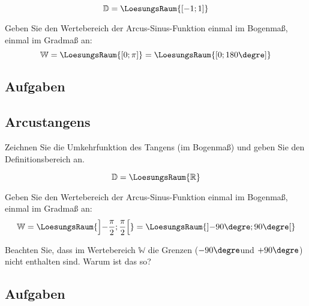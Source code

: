 $$\mathbb{D} = \LoesungsRaum{[-1; 1]}$$

Geben Sie den Wertebereich der Arcus-Sinus-Funktion einmal im Bogenmaß,
einmal im Gradmaß an:
$$\mathbb{W} = \LoesungsRaum{[0; \pi]}  =  \LoesungsRaum{[0; 180\degre]}$$

\subsection*{Aufgaben}
\TNTeop{}


\subsection{Arcustangens}
Zeichnen Sie die Umkehrfunktion des Tangens (im Bogenmaß) und geben Sie den Definitionsbereich an.



$$\mathbb{D} = \LoesungsRaum{\mathbb{R}}$$

Geben Sie den Wertebereich der Arcus-Sinus-Funktion einmal im Bogenmaß,
einmal im Gradmaß an:
$$\mathbb{W} = \LoesungsRaum{\left]-\frac{\pi}{2}; \frac{\pi}{2}\right[}  = \LoesungsRaum{\left]-90\degre; 90\degre\right[}$$

Beachten Sie, dass im Wertebereich $\mathbb{W}$ die Grenzen ($-90\degre$und $+90\degre$) nicht enthalten sind. Warum ist das so?

\subsection*{Aufgaben}
\TNTeop{}


